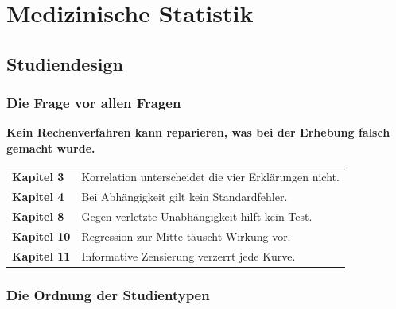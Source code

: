 \part{Medizinische Statistik}

\chapter{Studiendesign}

\section{Die Frage vor allen Fragen}

\begin{merksatz}
\begin{center}
\begin{minipage}{0.9\textwidth}
\textbf{Kein Rechenverfahren kann reparieren, was bei der Erhebung falsch gemacht wurde.}
\end{minipage}
\end{center}

\begin{center}
\renewcommand{\arraystretch}{1.5}
\begin{tabular}{@{}P{2.8cm}P{5.8cm}@{}}
\toprule
\textbf{Kapitel 3} & Korrelation unterscheidet die vier Erklärungen nicht.\\
\textbf{Kapitel 4} & Bei Abhängigkeit gilt kein Standardfehler.\\
\textbf{Kapitel 8} & Gegen verletzte Unabhängigkeit hilft kein Test.\\
\textbf{Kapitel 10} & Regression zur Mitte täuscht Wirkung vor.\\
\textbf{Kapitel 11} & Informative Zensierung verzerrt jede Kurve.\\
\bottomrule
\end{tabular}
\end{center}

\begin{center}
\begin{minipage}{0.88\textwidth}
\end{minipage}
\end{center}
\end{merksatz}

\section{Die Ordnung der Studientypen}

